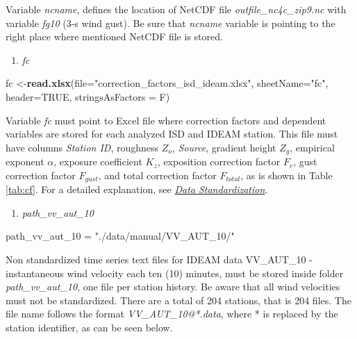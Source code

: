 \documentclass[12pt,oneside]{reedthesis}
\newenvironment{Shaded}{\begin{snugshade}}{\end{snugshade}}
\newcommand{\DataTypeTok}[1]{\textcolor[rgb]{0.13,0.29,0.53}{#1}}
\newcommand{\DecValTok}[1]{\textcolor[rgb]{0.00,0.00,0.81}{#1}}
\newcommand{\KeywordTok}[1]{\textcolor[rgb]{0.13,0.29,0.53}{\textbf{#1}}}
\newcommand{\NormalTok}[1]{#1}
\newcommand{\OtherTok}[1]{\textcolor[rgb]{0.56,0.35,0.01}{#1}}
\newcommand{\StringTok}[1]{\textcolor[rgb]{0.31,0.60,0.02}{#1}}
\providecommand{\tightlist}{%
  \setlength{\itemsep}{0pt}\setlength{\parskip}{0pt}}
\begin{document}
Variable \emph{ncname}, defines the location of NetCDF file \emph{outfile\_nc4c\_zip9.nc} with variable \emph{fg10} (3-s wind gust). Be sure that \emph{ncname} variable is pointing to the right place where mentioned NetCDF file is stored.
\begin{enumerate}
\def\labelenumi{\arabic{enumi}.}
\setcounter{enumi}{3}
\tightlist
\item
  \emph{fc}
\end{enumerate}
\scriptsize

\vspace{0.4cm}
\begin{Shaded}
\begin{Highlighting}[]
\NormalTok{      fc <-}\KeywordTok{read.xlsx}\NormalTok{(}\DataTypeTok{file=}\StringTok{"correction_factors_isd_ideam.xlsx"}\NormalTok{, }\DataTypeTok{sheetName=}\StringTok{"fc"}\NormalTok{, }\DataTypeTok{header=}\OtherTok{TRUE}\NormalTok{, }
                     \DataTypeTok{stringsAsFactors =}\NormalTok{ F)}
\end{Highlighting}
\end{Shaded}
\normalsize

Variable \emph{fc} must point to Excel file where correction factors and dependent variables are stored for each analyzed ISD and IDEAM station. This file must have columns \emph{Station ID}, roughness \(Z_o\), \emph{Source}, gradient height \(Z_g\), empirical exponent \(\alpha\), exposure coefficient \(K_z\), exposition correction factor \(F_e\), gust correction factor \(F_{gust}\), and total correction factor \(F_{total}\), as is shown in Table \ref{tab:cf}. For a detailed explanation, see \emph{\protect\hyperlink{rmd-standardization}{Data Standardization}}.
\begin{enumerate}
\def\labelenumi{\arabic{enumi}.}
\setcounter{enumi}{4}
\tightlist
\item
  \emph{path\_vv\_aut\_10}
\end{enumerate}
\scriptsize

\vspace{0.4cm}
\begin{Shaded}
\begin{Highlighting}[]
\NormalTok{      path_vv_aut_}\DecValTok{10}\NormalTok{ =}\StringTok{ "./data/manual/VV_AUT_10/"}
\end{Highlighting}
\end{Shaded}
\normalsize

Non standardized time series text files for IDEAM data VV\_AUT\_10 - instantaneous wind velocity each ten (10) minutes, must be stored inside folder \emph{path\_vv\_aut\_10}, one file per station history. Be aware that all wind velocities must not be standardized. There are a total of 204 stations, that is 204 files. The file name follows the format \emph{VV\_AUT\_10@*.data}, where * is replaced by the station identifier, as can be seen below.
\end{document}
